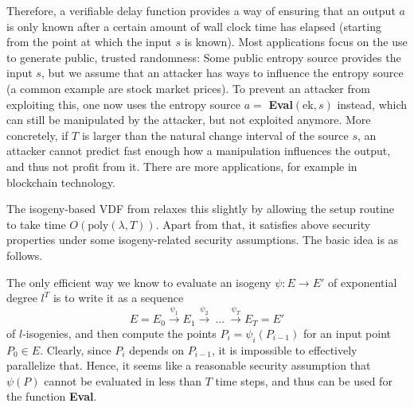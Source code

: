 Therefore, a verifiable delay function provides a way of ensuring that an output $a$ is only known after a certain amount of wall clock time has elapsed (starting from the point at which the input $s$ is known).
Most applications focus on the use to generate public, trusted randomness: Some public entropy source provides the input $s$, but we assume that an attacker has ways to influence the entropy source (a common example are stock market prices).
To prevent an attacker from exploiting this, one now uses the entropy source $a = $ \textbf{Eval}$(\mathrm{ek}, s)$ instead, which can still be manipulated by the attacker, but not exploited anymore.
More concretely, if $T$ is larger than the natural change interval of the source $s$, an attacker cannot predict fast enough how a manipulation influences the output, and thus not profit from it.
There are more applications, for example in blockchain technology.

The isogeny-based VDF from \cite{verifiable_delay_function} relaxes this slightly by allowing the setup routine to take time $O(\mathrm{poly}(\lambda, T))$.
Apart from that, it satisfies above security properties under some isogeny-related security assumptions.
The basic idea is as follows.

The only efficient way we know to evaluate an isogeny $\psi: E \to E'$ of exponential degree $l^T$ is to write it as a sequence
\begin{equation*}
    E = E_0 \overset{\psi_1}{\longrightarrow} E_1 \overset{\psi_2}{\longrightarrow} \ ... \ \overset{\psi_T}{\longrightarrow} E_T = E'
\end{equation*}
of $l$-isogenies, and then compute the points $P_i = \psi_i(P_{i - 1})$ for an input point $P_0 \in E$.
Clearly, since $P_i$ depends on $P_{i - 1}$, it is impossible to effectively parallelize that.
Hence, it seems like a reasonable security assumption that $\psi(P)$ cannot be evaluated in less than $T$ time steps, and thus can be used for the function \textbf{Eval}.

